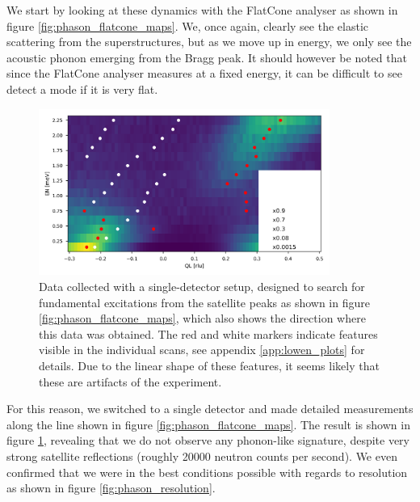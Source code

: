 We start by looking at these dynamics with the FlatCone analyser as shown in figure \ref{fig:phason_flatcone_maps}. We, once again, clearly see the elastic scattering from the superstructures, but as we move up in energy, we only see the acoustic phonon emerging from the Bragg peak. It should however be noted that since the FlatCone analyser measures at a fixed energy, it can be difficult to see detect a  mode if it is very flat.

\begin{figure}
    \centering
    \includegraphics[width=0.85\textwidth]{fig/lowen/phason_colorplot.png}
    \caption[lack of phasons]{Data collected with a single-detector setup, designed to search for fundamental excitations from the satellite peaks as shown in figure \ref{fig:phason_flatcone_maps}, which also shows the direction where this data was obtained. The red and white markers indicate features visible in the individual scans, see appendix \ref{app:lowen_plots} for details. Due to the linear shape of these features, it seems likely that these are artifacts of the experiment.}
    \label{fig:lcoo_phasons_colorplot}
\end{figure}

For this reason, we switched to a single detector and made detailed measurements along the line shown in figure \ref{fig:phason_flatcone_maps}. The result is shown in figure \ref{fig:lcoo_phasons_colorplot}, revealing that we do not observe any phonon-like signature, despite very strong satellite reflections (roughly 20000 neutron counts per second). We even confirmed that we were in the best conditions possible with regards to resolution as shown in figure \ref{fig:phason_resolution}.


